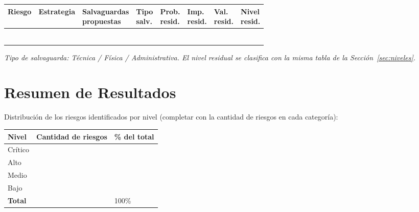 \documentclass[11pt,a4paper]{article}
\begin{document}
\begin{center}
\scriptsize
\renewcommand{\arraystretch}{1.6}
\begin{tabularx}{\textwidth}{@{} >{\centering\arraybackslash}p{1.3cm} >{\raggedright\arraybackslash}p{1.7cm} X >{\raggedright\arraybackslash}p{1.7cm} >{\centering\arraybackslash}p{1cm} >{\centering\arraybackslash}p{1cm} >{\centering\arraybackslash}p{1cm} >{\centering\arraybackslash}p{1.3cm} @{}}
\toprule
\textbf{Riesgo} & \textbf{Estrategia} & \shortstack{\textbf{Salvaguardas}\\\textbf{propuestas}} & \shortstack{\textbf{Tipo}\\\textbf{salv.}} & \shortstack{\textbf{Prob.}\\\textbf{resid.}} & \shortstack{\textbf{Imp.}\\\textbf{resid.}} & \shortstack{\textbf{Val.}\\\textbf{resid.}} & \shortstack{\textbf{Nivel}\\\textbf{resid.}} \\
\midrule
 & & & & & & & \\
 & & & & & & & \\
 & & & & & & & \\
 & & & & & & & \\
 & & & & & & & \\
 & & & & & & & \\
\bottomrule
\end{tabularx}
\end{center}

\textit{Tipo de salvaguarda: Técnica / Física / Administrativa. El nivel residual se clasifica con la misma tabla de la Sección~\ref{sec:niveles}.}

\section{Resumen de Resultados}

Distribución de los riesgos identificados por nivel (completar con la cantidad de riesgos en cada categoría):

\begin{center}
\renewcommand{\arraystretch}{1.4}
\begin{tabularx}{0.85\textwidth}{@{} p{4cm} p{3.5cm} X @{}}
\toprule
\textbf{Nivel} & \textbf{Cantidad de riesgos} & \textbf{\% del total} \\
\midrule
\cellcolor{nivelcritico} Crítico & & \\
\cellcolor{nivelalto} Alto & & \\
\cellcolor{nivelmedio} Medio & & \\
\cellcolor{nivelbajo} Bajo & & \\
\midrule
\textbf{Total} & & 100\% \\
\bottomrule
\end{tabularx}
\end{center}
\end{document}
